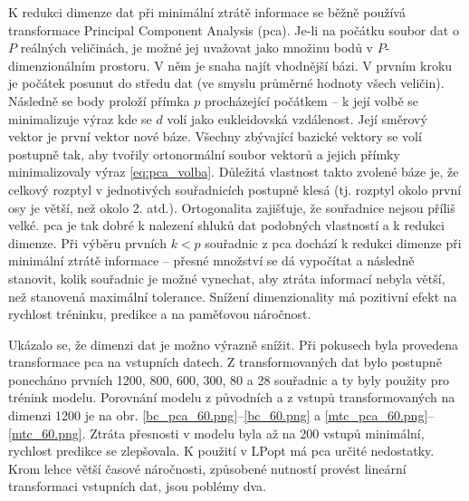 K redukci dimenze dat při minimální ztrátě informace se běžně používá transformace Principal Component Analysis (\ac{pca}). Je-li na počátku soubor dat 
o $P$ reálných veličinách, je možné jej uvažovat jako množinu bodů v $P$-dimenzionálním prostoru. V něm je snaha najít vhodnější bázi. 
V prvním kroku je počátek posunut do středu dat (ve smyslu průměrné hodnoty všech veličin). Následně se body proloží přímka $p$
procházející počátkem -- k její volbě se minimalizuje výraz 
kde se $d$ volí jako eukleidovská vzdálenost. 
Její směrový vektor je první vektor nové báze. Všechny zbývající bazické vektory se volí postupně tak, aby tvořily ortonormální soubor 
vektorů a jejich přímky minimalizovaly výraz \eqref{eq:pca_volba}. 
Důležitá vlastnost takto zvolené báze je, že celkový rozptyl v jednotivých souřadnicích postupně klesá (tj. rozptyl okolo první osy je větší, než 
okolo 2. atd.). Ortogonalita zajišťuje, že souřadnice nejsou příliš velké. \ac{pca} je tak dobré k nalezení shluků dat podobných vlastností a k redukci 
dimenze. 
Při výběru prvních $k<p$ souřadnic z \ac{pca} dochází k redukci dimenze při minimální ztrátě informace -- přesné množství se dá vypočítat 
a následně stanovit, kolik souřadnic je možné vynechat, aby ztráta informací nebyla větší, než stanovená maximální tolerance. Snížení dimenzionality má pozitivní 
efekt na rychlost tréninku, predikce a na paměťovou náročnost. 

Ukázalo se, že dimenzi dat je možno výrazně snížit. Při pokusech byla provedena transformace \ac{pca} na vstupních datech. Z transformovaných dat bylo postupně 
ponecháno 
prvních 1200, 800, 600, 300, 80 a 28 souřadnic a ty byly použity pro trénink modelu. Porovnání modelu z původních a z vstupů transformovaných na dimenzi 
1200 je na obr. \ref{bc_pca_60.png}--\ref{bc_60.png} a \ref{mtc_pca_60.png}--\ref{mtc_60.png}. Ztráta přesnosti v modelu byla až na 200 vstupů minimální, rychlost predikce se zlepšovala.  
K použití v LPopt má \ac{pca} určité nedostatky. Krom lehce větší časové náročnosti, způsobené nutností provést lineární transformaci vstupních dat, jsou 
poblémy dva.

